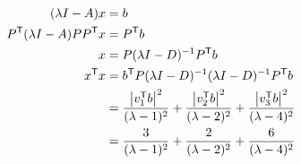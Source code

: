 \documentclass[../ap_2013.tex]{subfiles}
\begin{document}
\section{}
\begin{equation}\begin{aligned}[b]
    (\lambda I-A)x &= b\\
    P^\mathsf{T}(\lambda I-A)P P ^\mathsf{T}x &= P^\mathsf{T} b\\
    x &= P(\lambda I-D)^{-1}P^\mathsf{T}b\\
    x^\mathsf{T}x &= b^\mathsf{T} P(\lambda I-D)^{-1}(\lambda I-D)^{-1}P^\mathsf{T}b\\
    &= \frac{\abs{v_1^\mathsf{T}b}^2}{(\lambda-1)^2} + \frac{\abs{v_2^\mathsf{T}b}^2}{(\lambda-2)^2} +\frac{\abs{v_3^\mathsf{T}b}^2}{(\lambda-4)^2}\\
    &= \frac{3}{(\lambda-1)^2} + \frac{2}{(\lambda-2)^2} +\frac{6}{(\lambda-4)^2}
\end{aligned}\end{equation}
\end{document}
